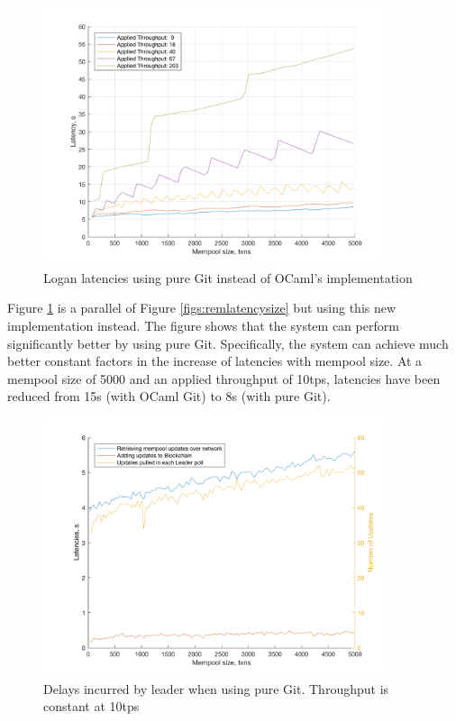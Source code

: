 \documentclass[12pt,a4paper,twoside,openright]{report}
\begin{document}
	\begin{figure}
		\centering
		\includegraphics[width=0.9\textwidth]{figs/latency_sizes_throughputs.png}
		\caption{Logan latencies using pure Git instead of OCaml's implementation}
		\label{figs:latenciespuregit}
	\end{figure}
	Figure \ref{figs:latenciespuregit} is a parallel of Figure \ref{figs:remlatencysize} but using this new implementation instead. 
	The figure shows that the system can perform significantly better by using pure Git. 
	Specifically, the system can achieve much better constant factors in the increase of latencies with mempool size.
	At a mempool size of 5000 and an applied throughput of 10tps, latencies have been reduced from 15s (with OCaml Git) to 8s (with pure Git).
	\begin{figure}
		\centering
		\includegraphics[width=0.9\textwidth]{figs/bottlenecks.png}
		\caption{Delays incurred by leader when using pure Git. Throughput is constant at 10tps}
		\label{figs:bottleneckspuregit}
	\end{figure}
\end{document}
